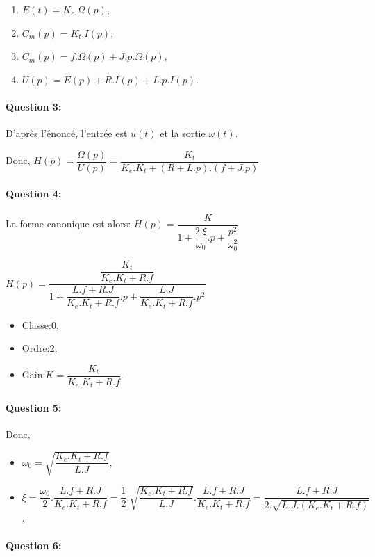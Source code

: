 \begin{enumerate}
 \item $E(t)=K_e.\Omega(p)$,
 \item $C_m(p)=K_t.I(p)$,
 \item $C_m(p)=f.\Omega(p)+J.p.\Omega(p)$,
 \item $U(p)=E(p)+R.I(p)+L.p.I(p)$.
\end{enumerate}

\paragraph{Question 3:}

D'après l'énoncé, l'entrée est $u(t)$ et la sortie $\omega(t)$.

Donc, $H(p)=\dfrac{\Omega(p)}{U(p)}=\dfrac{K_t}{K_e.K_t+(R+L.p).(f+J.p)}$

\paragraph{Question 4:}

La forme canonique est alors: $H(p)=\dfrac{K}{1+\dfrac{2.\xi}{\omega_0}.p+\dfrac{p^2}{\omega_0^2}}$

$H(p)=\dfrac{\dfrac{K_t}{K_e.K_t+R.f}}{1+\dfrac{L.f+R.J}{K_e.K_t+R.f}.p+\dfrac{L.J}{K_e.K_t+R.f}.p^2}$

\begin{itemize}
 \item Classe:0,
 \item Ordre:2,
 \item Gain:$K=\dfrac{K_t}{K_e.K_t+R.f}$.
\end{itemize}

\paragraph{Question 5:}

Donc,

\begin{itemize}
 \item $\omega_0=\sqrt{\dfrac{K_e.K_t+R.f}{L.J}}$,
 \item $\xi=\dfrac{\omega_0}{2}.\dfrac{L.f+R.J}{K_e.K_t+R.f}=\dfrac{1}{2}.\sqrt{\dfrac{K_e.K_t+R.f}{L.J}}.\dfrac{L.f+R.J}{K_e.K_t+R.f}=\dfrac{L.f+R.J}{2.\sqrt{L.J.(K_e.K_t+R.f)}}$,
\end{itemize}

\paragraph{Question 6:}


